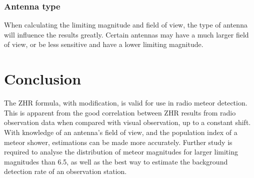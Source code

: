 \subsubsection{Antenna type}
When calculating the limiting magnitude and field of view, the type of antenna will influence the results greatly. Certain antennas may have a much larger field of view, or be less sensitive and have a lower limiting magnitude. 
\section{Conclusion}
The ZHR formula, with modification, is valid for use in radio meteor detection. This is apparent from the good correlation between ZHR results from radio observation data when compared with visual observation, up to a constant shift. With knowledge of an antenna's field of view, and the population index of a meteor shower, estimations can be made more accurately. Further study is required to analyse the distribution of meteor magnitudes for larger limiting magnitudes than 6.5, as well as the best way to estimate the background detection rate of an observation station.